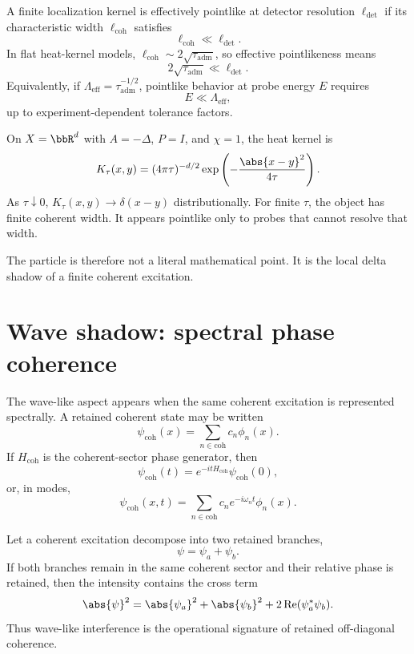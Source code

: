 \documentclass[11pt]{article}
\newcommand{\ta}{\tau_{\mathrm{adm}}}
\newcommand{\Leff}{\Lambda_{\mathrm{eff}}}
\newcommand{\coh}{\mathrm{coh}}
\begin{document}
\begin{definition}
A finite localization kernel is effectively pointlike at detector resolution \(\ell_{\det}\) if its
characteristic width \(\ell_{\coh}\) satisfies
\[
  \ell_{\coh}\ll \ell_{\det}.
\]
In flat heat-kernel models, \(\ell_{\coh}\sim 2\sqrt{\ta}\), so effective pointlikeness means
\[
  2\sqrt{\ta}\ll \ell_{\det}.
\]
Equivalently, if \(\Leff=\ta^{-1/2}\), pointlike behavior at probe energy \(E\) requires
\[
  E\ll \Leff,
\]
up to experiment-dependent tolerance factors.
\end{definition}

\begin{example}
On \(X=\bbR^d\) with \(A=-\Delta\), \(P=I\), and \(\chi=1\), the heat kernel is
\[
  K_\tau(x,y)
  =
  (4\pi\tau)^{-d/2}
  \exp\left(-\frac{\abs{x-y}^2}{4\tau}\right).
\]
As \(\tau\downarrow0\), \(K_\tau(x,y)\to\delta(x-y)\) distributionally. For finite \(\tau\),
the object has finite coherent width. It appears pointlike only to probes that cannot resolve
that width.
\end{example}

The particle is therefore not a literal mathematical point. It is the local delta shadow of a
finite coherent excitation.

\section{Wave shadow: spectral phase coherence}

The wave-like aspect appears when the same coherent excitation is represented spectrally.
A retained coherent state may be written
\[
  \psi_{\coh}(x)
  =
  \sum_{n\in\coh}c_n\phi_n(x).
\]
If \(H_{\coh}\) is the coherent-sector phase generator, then
\[
  \psi_{\coh}(t)
  =
  e^{-itH_{\coh}}\psi_{\coh}(0),
\]
or, in modes,
\[
  \psi_{\coh}(x,t)
  =
  \sum_{n\in\coh}
  c_ne^{-i\omega_nt}\phi_n(x).
\]

\begin{proposition}
Let a coherent excitation decompose into two retained branches,
\[
  \psi=\psi_a+\psi_b.
\]
If both branches remain in the same coherent sector and their relative phase is retained, then
the intensity contains the cross term
\[
  \abs{\psi}^2
  =
  \abs{\psi_a}^2+\abs{\psi_b}^2
  +
  2\operatorname{Re}(\psi_a^\ast\psi_b).
\]
Thus wave-like interference is the operational signature of retained off-diagonal coherence.
\end{proposition}
\end{document}
